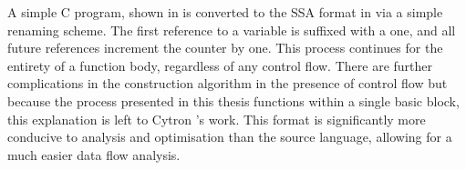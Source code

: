 \documentclass[\main/thesis.tex]{subfiles}
\begin{document}
A simple C program, shown in  is converted to the SSA format in  via a simple renaming scheme.
The first reference to a variable is suffixed with a one, and all future references increment the counter by one.
This process continues for the entirety of a function body, regardless of any control flow.
There are further complications in the construction algorithm in the presence of control flow but because the process presented in this thesis functions within a single \gls{basic block}, this explanation is left to Cytron \etal's work.
This format is significantly more conducive to analysis and optimisation than the source language, allowing for a much easier data flow analysis.
\end{document}
